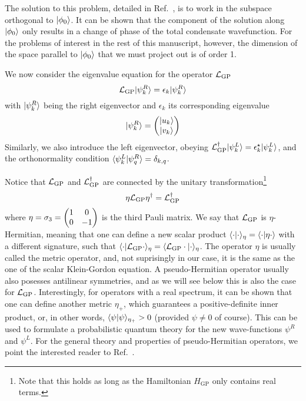 The solution to this problem, detailed in Ref.~\cite{Castin_1998},
is to work in the subspace orthogonal to $\vert \phi_0 \rangle$. It can be
shown that the component of the solution along $\vert \phi_0 \rangle$ only
results in a change of phase of the total condensate wavefunction. For
the problems of interest in the rest of this manuscript, however, the
dimension of the space parallel to $\vert \phi_0 \rangle$ that we must project
out is of order 1.

We now consider the eigenvalue equation for the operator $\mathcal{L}_{\text{GP}}$
%
\begin{equation}\label{eq:L-eigen}
  \mathcal{L}_{\text{GP}} \vert \psi_k^R \rangle = \epsilon_k \vert \psi_k^R \rangle
\end{equation}
% 
with $\vert \psi_k^R \rangle$ being the right eigenvector and $\epsilon_k$ its
corresponding eigenvalue
%
\begin{equation}\label{eq:psi-R}
  \vert \psi_k^R \rangle = \begin{pmatrix} \vert u_k \rangle\\ \vert v_k \rangle \end{pmatrix}
\end{equation}
% 
Similarly, we also introduce the left eigenvector, obeying
$\mathcal{L}_{\text{GP}}^{\dagger} \vert \psi_k^L \rangle = \epsilon_k^{\star} \vert \psi_k^L \rangle$,
and the orthonormality condition
$\langle \psi_k^L \vert \psi_q^R \rangle = \delta_{k,q}$. 

Notice that $\mathcal{L}_{\text{GP}}$ and $\mathcal{L}_{\text{GP}}^{\dagger}$ are
connected by the unitary transformation\footnote{Note that this holds
  as long as the Hamiltonian $H_{\text{GP}}$ only contains real
  terms.}
%
\begin{equation}\label{eq:symmetry-1}
  \eta \mathcal{L}_{\text{GP}} \eta^{\dagger} = \mathcal{L}_{\text{GP}}^{\dagger}
\end{equation}
% 
where $\eta = \sigma_3 = \begin{pmatrix} 1 & 0\\ 0 & -1 \end{pmatrix}$ is the third Pauli
matrix. We say that $\mathcal{L}_{\text{GP}}$ is $\eta$-Hermitian, meaning
that one can define a new scalar product
$\langle \cdot \vert \cdot \rangle_{\eta} = \langle \cdot \vert \eta \cdot \rangle$ with a
different signature, such that
$\langle \cdot \vert \mathcal{L}_{\text{GP}} \cdot \rangle_{\eta} =
\langle \mathcal{L}_{\text{GP}} \cdot \vert \cdot \rangle_{\eta}$. The operator $\eta$ is
usually called the metric operator, and, not suprisingly in our case,
it is the same as the one of the scalar Klein-Gordon equation. A
pseudo-Hermitian operator usually also posesses antilinear symmetries,
and as we will see below this is also the case for
$\mathcal{L}_{\text{GP}}$. Interestingly, for operators with a real spectrum,
it can be shown that one can define another metric $\eta_+$, which
guarantees a positive-definite inner product, or, in other words,
$\langle \psi \vert \psi \rangle_{\eta_+} > 0$ (provided $\psi \neq 0$ of
course). This can be used to formulate a probabilistic quantum theory
for the new wave-functions $\psi^R$ and $\psi^L$. For the general
theory and properties of pseudo-Hermitian operators, we point the
interested reader to Ref.~\cite{MOSTAFAZADEH_2010}.


